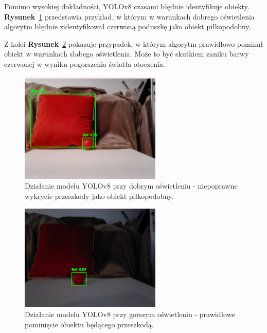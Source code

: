 \documentclass[a4paper,twoside,12pt]{book}
\begin{document}
Pomimo wysokiej dokładności, YOLOv8 czasami błędnie identyfikuje obiekty. \textbf{Rysunek}~\ref{fig:yolov8_good_light_bad_object} przedstawia przykład, w którym w warunkach dobrego oświetlenia algorytm błędnie zidentyfikował czerwoną poduszkę jako obiekt piłkopodobny.

Z kolei \textbf{Rysunek}~\ref{fig:yolov8_good_light_good_object} pokazuje przypadek, w którym algorytm prawidłowo pominął obiekt w warunkach słabego oświetlenia. Może to być skutkiem zaniku barwy czerwonej w wyniku pogorszenia światła otoczenia.

\begin{figure}[h]
    \centering
    \includegraphics[width=0.6\textwidth]{Images/Porownanie/Yolo 8 laptop/Zrzut ekranu 2025-01-02 194808.png}
    \caption{Działanie modelu YOLOv8 przy dobrym oświetleniu - niepoprawne wykrycie przeszkody jako obiekt piłkopodobny.}
    \label{fig:yolov8_good_light_bad_object}
\end{figure}

\begin{figure}[h]
    \centering
    \includegraphics[width=0.6\textwidth]{Images/Porownanie/Yolo 8 laptop/Zrzut ekranu 2025-01-02 194704.png}
    \caption{Działanie modelu YOLOv8 przy gorszym oświetleniu - prawidłowe pominięcie obiektu będącego przeszkodą.}
    \label{fig:yolov8_good_light_good_object}
\end{figure}
\end{document}
